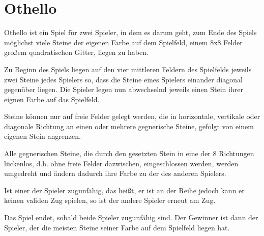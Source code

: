 \section{Othello}

Othello ist ein Spiel für zwei Spieler, in dem es darum geht, zum Ende des Spiels möglichst viele Steine der eigenen Farbe auf dem Spielfeld, einem 8x8 Felder großem quadratischen Gitter, liegen zu haben.


Zu Beginn des Spiels liegen auf den vier mittleren Feldern des Spielfelds jeweils zwei Steine jedes Spielers so, dass die Steine eines Spielers einander diagonal gegenüber liegen.
Die Spieler legen nun abwechselnd jeweils einen Stein ihrer eignen Farbe auf das Spielfeld.

Steine können nur auf freie Felder gelegt werden, die in horizontale, vertikale oder diagonale Richtung an einen oder mehrere gegnerische Steine, gefolgt von einem eigenen Stein angrenzen.


Alle gegnerischen Steine, die durch den gesetzten Stein in eine der 8 Richtungen lückenlos, d.h. ohne freie Felder dazwischen, eingeschlossen werden, werden umgedreht und ändern dadurch ihre Farbe zu der des anderen Spielers.

Ist einer der Spieler zugunfähig, das heißt, er ist an der Reihe jedoch kann er keinen validen Zug spielen, so ist der andere Spieler erneut am Zug.

Das Spiel endet, sobald beide Spieler zugunfähig sind. Der Gewinner ist dann der Spieler, der die meisten Steine seiner Farbe auf dem Spielfeld liegen hat.
\cite{worldothellorules}

